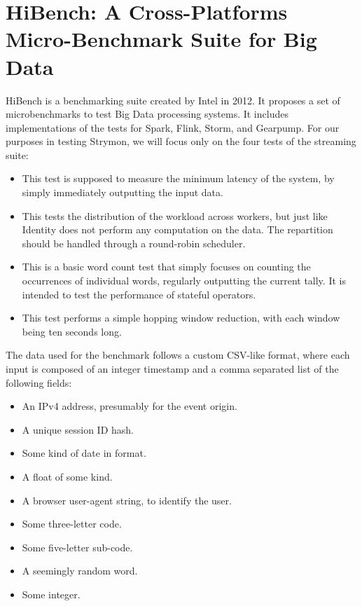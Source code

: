 \section{HiBench: A Cross-Platforms Micro-Benchmark Suite for Big Data\cite{hibench}}
HiBench is a benchmarking suite created by Intel in 2012. It proposes a set of microbenchmarks to test Big Data processing systems. It includes implementations of the tests for Spark, Flink, Storm, and Gearpump. For our purposes in testing Strymon, we will focus only on the four tests of the streaming suite:

\begin{itemize}
\item {} This test is supposed to measure the minimum latency of the system, by simply immediately outputting the input data.
\item {} This tests the distribution of the workload across workers, but just like Identity does not perform any computation on the data. The repartition should be handled through a round-robin scheduler.
\item {} This is a basic word count test that simply focuses on counting the occurrences of individual words, regularly outputting the current tally. It is intended to test the performance of stateful operators.
\item {} This test performs a simple hopping window reduction, with each window being ten seconds long.
\end{itemize}

The data used for the benchmark follows a custom CSV-like format, where each input is composed of an integer timestamp and a comma separated list of the following fields:

\begin{itemize}
\item {} An IPv4 address, presumably for the event origin.
\item {} A unique session ID hash.
\item {} Some kind of date in  format.
\item {} A float of some kind.
\item {} A browser user-agent string, to identify the user.
\item {} Some three-letter code.
\item {} Some five-letter sub-code.
\item {} A seemingly random word.
\item {} Some integer.
\end{itemize}

